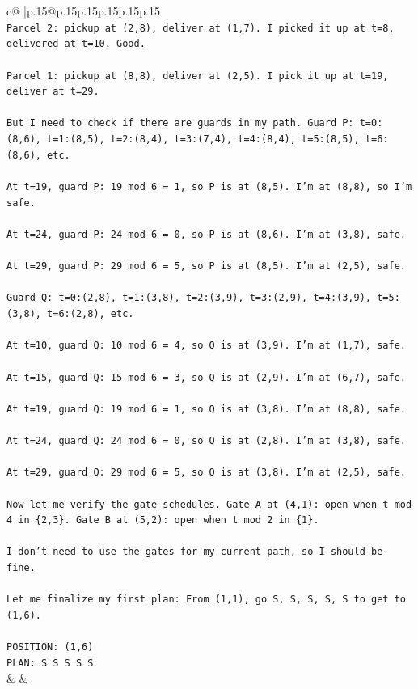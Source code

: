 \documentclass{article}
\begin{document}
{\begin{supertabular}{c@{$\;$}|p{.15\linewidth}@{}p{.15\linewidth}p{.15\linewidth}p{.15\linewidth}p{.15\linewidth}p{.15\linewidth}}
{{{\\ 
\texttt{Parcel 2: pickup at (2,8), deliver at (1,7). I picked it up at t=8, delivered at t=10. Good.} \\
\\ 
\texttt{Parcel 1: pickup at (8,8), deliver at (2,5). I pick it up at t=19, deliver at t=29.} \\
\\ 
\texttt{But I need to check if there are guards in my path. Guard P: t=0:(8,6), t=1:(8,5), t=2:(8,4), t=3:(7,4), t=4:(8,4), t=5:(8,5), t=6:(8,6), etc.} \\
\\ 
\texttt{At t=19, guard P: 19 mod 6 = 1, so P is at (8,5). I'm at (8,8), so I'm safe.} \\
\\ 
\texttt{At t=24, guard P: 24 mod 6 = 0, so P is at (8,6). I'm at (3,8), safe.} \\
\\ 
\texttt{At t=29, guard P: 29 mod 6 = 5, so P is at (8,5). I'm at (2,5), safe.} \\
\\ 
\texttt{Guard Q: t=0:(2,8), t=1:(3,8), t=2:(3,9), t=3:(2,9), t=4:(3,9), t=5:(3,8), t=6:(2,8), etc.} \\
\\ 
\texttt{At t=10, guard Q: 10 mod 6 = 4, so Q is at (3,9). I'm at (1,7), safe.} \\
\\ 
\texttt{At t=15, guard Q: 15 mod 6 = 3, so Q is at (2,9). I'm at (6,7), safe.} \\
\\ 
\texttt{At t=19, guard Q: 19 mod 6 = 1, so Q is at (3,8). I'm at (8,8), safe.} \\
\\ 
\texttt{At t=24, guard Q: 24 mod 6 = 0, so Q is at (2,8). I'm at (3,8), safe.} \\
\\ 
\texttt{At t=29, guard Q: 29 mod 6 = 5, so Q is at (3,8). I'm at (2,5), safe.} \\
\\ 
\texttt{Now let me verify the gate schedules. Gate A at (4,1): open when t mod 4 in \{2,3\}. Gate B at (5,2): open when t mod 2 in \{1\}.} \\
\\ 
\texttt{I don't need to use the gates for my current path, so I should be fine.} \\
\\ 
\texttt{Let me finalize my first plan: From (1,1), go S, S, S, S, S to get to (1,6).} \\
\\ 
\texttt{POSITION: (1,6)} \\
\texttt{PLAN: S S S S S} \\
            }
        }
    }
    & & \\ \\


\end{supertabular}}
\end{document}
